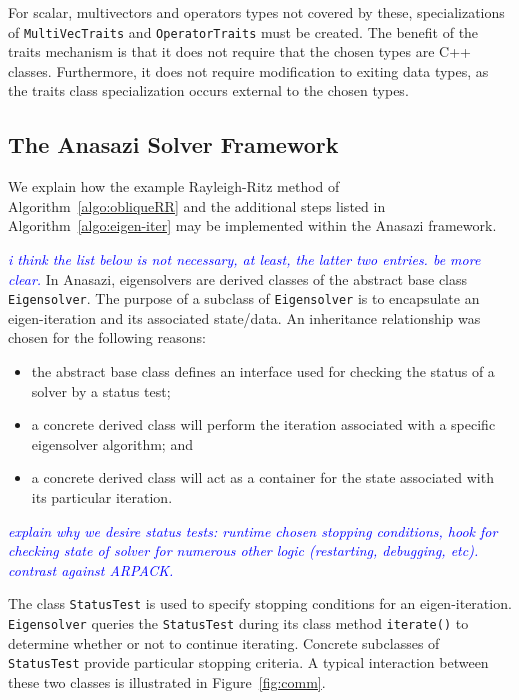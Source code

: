 \documentclass[acmtoms]{acmtrans2m}
\newcounter{algorithm}
\newcommand{\aspace}[1]{\texttt{#1}}
\newcommand{\cbcomm}[1]{\textcolor{blue}{\emph{#1}}}
\begin{document}
For scalar, multivectors and operators types not covered by these,
specializations of \aspace{MultiVecTraits} and \aspace{OperatorTraits}
must be created. The benefit of the traits mechanism is that it does
not require that the chosen types are C++ classes.  Furthermore, it
does not require modification to exiting data types, as the traits
class specialization occurs external to the chosen types.


\subsection{The Anasazi Solver Framework}
\label{subsec:anasazi:solver_framework}

We explain how the example Rayleigh-Ritz method of
Algorithm~\ref{algo:obliqueRR} and the additional steps listed in
Algorithm~\ref{algo:eigen-iter} may be implemented within the Anasazi
framework.

\cbcomm{i think the list below is not necessary, at least, the latter
two entries. be more clear.}
In Anasazi, eigensolvers are derived classes of the abstract base
class \aspace{Eigensolver}. The purpose of a subclass of
\aspace{Eigensolver} is to encapsulate an eigen-iteration and
its associated state/data. An inheritance relationship was chosen for
the following reasons:
\begin{itemize}
  \item the abstract base class defines an interface used for checking the
    status of a solver by a status test;
  \item a concrete derived class will perform the iteration associated
    with a specific eigensolver algorithm; and
  \item a concrete derived class will act as a container for the state
    associated with its particular iteration.
\end{itemize}

\cbcomm{explain why we desire status tests: runtime chosen stopping
conditions, hook for checking state of solver for numerous other logic
(restarting, debugging, etc). contrast against ARPACK.}

The class \aspace{StatusTest} is used to specify stopping conditions for an
eigen-iteration. \aspace{Eigensolver} queries the \aspace{StatusTest} during its class
method \aspace{iterate()} to determine whether or not to continue iterating. Concrete
subclasses of \aspace{StatusTest} provide particular stopping criteria. A typical
interaction between these two classes is illustrated in Figure~\ref{fig:comm}.
\end{document}
